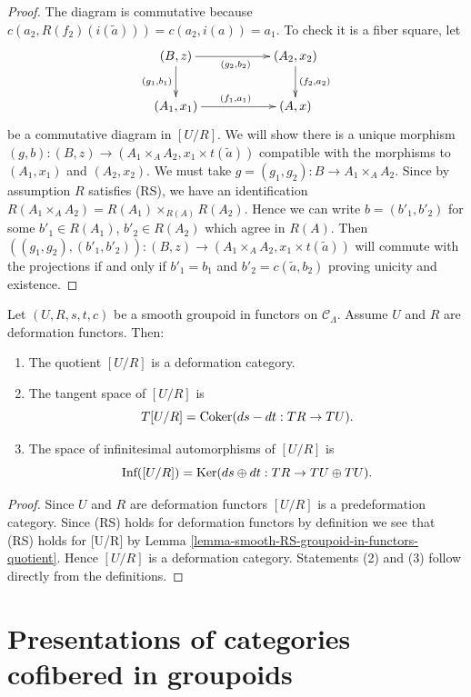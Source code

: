 \begin{proof}
\medskip\noindent
The diagram is commutative because
$c(a_2, R(f_2)(i(\widetilde{a}))) = c(a_2, i(a)) = a_1$.
To check it is a fiber square, let
$$
\xymatrix{
(B, z) \ar[d]_{(g_1, b_1)} \ar[rr]_{(g_2, b_2)} & & (A_2, x_2)
\ar[d]^{(f_2, a_2)} \\
(A_1, x_1) \ar[rr]^{(f_1, a_1)} & & (A, x)
}
$$
be a commutative diagram in $[U/R]$. We will show there is a unique morphism
$(g, b) : (B, z) \to (A_1 \times_A A_2, x_1 \times t(\widetilde{a}))$
compatible with the morphisms to $(A_1, x_1)$ and $(A_2, x_2)$.
We must take $g = (g_1, g_2) : B \to A_1 \times_A A_2$.
Since by assumption $R$ satisfies (RS), we have an identification
$R(A_1 \times_A A_2) = R(A_1) \times_{R(A)} R(A_2)$.
Hence we can write $b = (b'_1, b'_2)$ for some
$b'_1 \in R(A_1)$, $b'_2 \in R(A_2)$ which agree in $R(A)$.
Then
$((g_1, g_2), (b'_1, b'_2)) : (B, z) \to
(A_1 \times_A A_2, x_1 \times t(\widetilde{a}))$
will commute with the projections if and only if
$b'_1 = b_1$ and $b'_2 = c(\widetilde{a}, b_2)$ proving unicity and
existence.
\end{proof}

\begin{lemma}
\label{lemma-deformation-groupoid-quotient}
Let $(U, R, s, t, c)$ be a smooth groupoid in functors on $\mathcal{C}_\Lambda$.
Assume $U$ and $R$ are deformation functors. Then:
\begin{enumerate}
\item The quotient $[U/R]$ is a deformation category.
\item The tangent space of $[U/R]$ is
$$
T[U/R] = \mathop{\mathrm{Coker}}(ds-dt: TR \to TU).
$$
\item The space of infinitesimal automorphisms of $[U/R]$ is
$$
\text{Inf}([U/R]) =
\mathop{\mathrm{Ker}}(ds \oplus dt : TR \to TU \oplus TU).
$$
\end{enumerate}
\end{lemma}

\begin{proof}
Since $U$ and $R$ are deformation functors $[U/R]$ is a predeformation
category. Since (RS) holds for deformation functors by
definition we see that (RS) holds for [U/R] by
Lemma \ref{lemma-smooth-RS-groupoid-in-functors-quotient}.
Hence $[U/R]$ is a deformation category. Statements (2) and (3)
follow directly from the definitions.
\end{proof}







\section{Presentations of categories cofibered in groupoids}
\label{section-presentation-categories-cofibred-in-groupoids}

